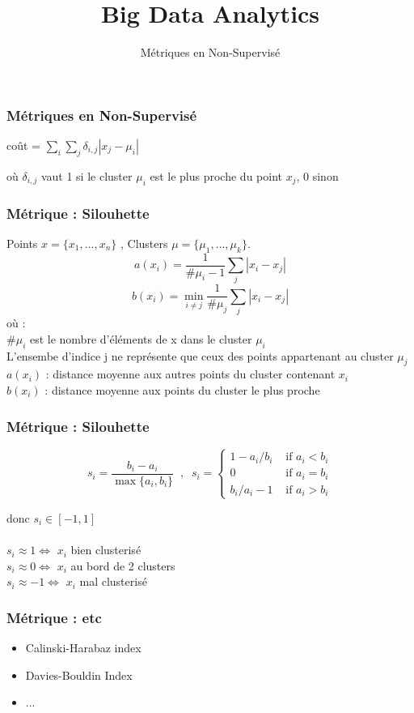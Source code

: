 \documentclass{formation}
\title{Big Data Analytics}
\subtitle{Métriques en Non-Supervisé}
\begin{document}
\maketitle

\begin{frame}
  \frametitle{Métriques en Non-Supervisé}
  \begin{center}
    coût = $\sum_i \sum_j \delta_{i,j}\left| x_j - \mu_i \right|$
  \end{center}
  où $\delta_{i,j}$ vaut 1 si le cluster $\mu_i$ est le plus proche du point $x_j$, 0 sinon
\end{frame}

\begin{frame}
  \frametitle{Métrique : Silouhette}
  Points $x = \{x_1, \dotsc, x_n\}$ , Clusters $\mu = \{\mu_1, \dotsc, \mu_k\}$. \\
  \[
  \boxed{a(x_i) = \frac{1}{\#\mu_i-1}\sum_j |x_i - x_j|}
  \]
  \[
  \boxed{b(x_i) = \min_{i \neq j} \frac{1}{\#\mu_j}\sum_j |x_i - x_j|}
  \]
  où : \\
  $\#\mu_i$ est le nombre d'éléments de x dans le cluster $\mu_i$ \\
  L'ensembe d'indice j ne représente que ceux des points appartenant au cluster $\mu_j$ \\
  $a(x_i)$ : distance moyenne aux autres points du cluster contenant $x_i$ \\
  $b(x_i)$ : distance moyenne aux points du cluster le plus proche
  
\end{frame}

\begin{frame}
  \frametitle{Métrique : Silouhette}
  
  \begin{center}
    \[
    s_i = \frac{b_i - a_i}{\max\{a_i, b_i\}}\;\;,\;\;
    s_i = \left\{
    \begin{array}{ll}
      1 - a_i/b_i & \mbox{ if } a_i < b_i \\[2mm]
      0 & \mbox{ if } a_i = b_i \\[2mm]
      b_i / a_i - 1 & \mbox{ if } a_i > b_i
    \end{array}\right.
    \]
    
  \end{center}
  donc $s_i \in [-1, 1]$ \\
  \\
  $s_i \approx 1 \iff$ $x_i$ bien clusterisé \\
  $s_i \approx 0 \iff$ $x_i$ au bord de 2 clusters\\
  $s_i \approx -1 \iff$ $x_i$ mal clusterisé
\end{frame}

\begin{frame}
  \frametitle{Métrique : etc}
  \begin{itemize}
  \item Calinski-Harabaz index
  \item Davies-Bouldin Index
  \item ...
  \end{itemize}
\end{frame}
\end{document}
